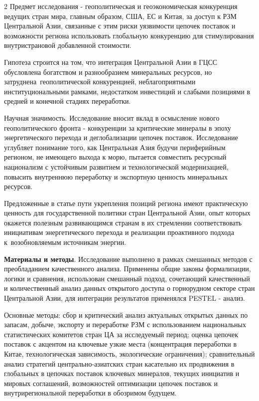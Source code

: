 \begin{multicols}{2}
Предмет исследования - геополитическая и геоэкономическая конкуренция
ведущих стран мира, главным образом, США, ЕС и Китая, за доступ к РЗМ
Центральной Азии, связанные с этим риски уязвимости цепочек поставок и
возможности региона использовать глобальную конкуренцию для
стимулирования внутристрановой добавленной стоимости.

Гипотеза строится на том, что интеграция Центральной Азии в ГЦСС
обусловлена богатством и разнообразием минеральных ресурсов, но
затруднена~геополитической конкуренцией, неблагоприятными
институциональными рамками, недостатком инвестиций и слабыми позициями в
средней и конечной стадиях переработки.

Научная значимость. Исследование вносит вклад в осмысление
нового геополитического фронта - конкуренции за критические минералы в
эпоху энергетического перехода и деглобализации цепочек поставок.
Исследование углубляет понимание того, как Центральная Азия будучи
периферийным регионом, не имеющего выхода к морю, пытается совместить
ресурсный национализм с устойчивым развитием и технологической
модернизацией, повысить внутреннюю переработку и экспортную ценность
минеральных ресурсов.

Предложенные в статье пути укрепления позиций региона имеют практическую
ценность для государственной политики стран Центральной Азии, опыт
которых окажется полезным развивающимся странам в их стремлении
соответствовать инициативам энергетического перехода и реализации
проактивного подхода к~возобновляемым источникам энергии.

{\bfseries Материалы и методы}. Исследование выполнено в рамках смешанных
методов с преобладанием качественного анализа. Применены общие законы
формализации, логики и сравнения, использован смешанный подход,
сочетающий качественный и количественный анализ данных открытого доступа
о горнорудном секторе стран Центральной Азии, для интеграции результатов
применялся PESTEL - анализ.

Основные методы: сбор и критический анализ актуальных открытых данных по
запасам, добыче, экспорту и переработке РЗМ с использованием
национальных статистических комитетов стран ЦА за исследуемый период;
оценка цепочек поставок с акцентом на ключевые узкие места (концентрация
переработки в Китае, технологическая зависимость, экологические
ограничения); сравнительный анализ стратегий центрально-азиатских стран
касательно их продвижения в глобальных в цепочках поставок ключевых
минералов, текущих инициатив и мировых соглашений, возможностей
оптимизации цепочек поставок и внутрирегиональной переработки в
обозримом будущем.


\end{multicols}
